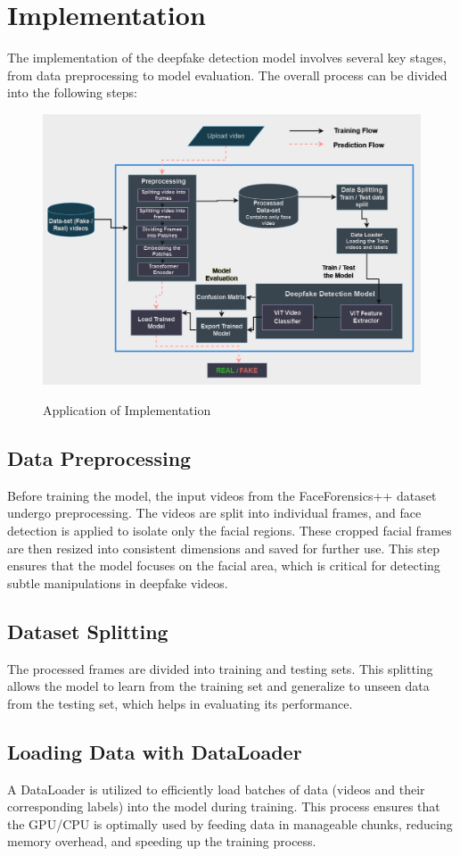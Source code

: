 \section{Implementation}
The implementation of the deepfake detection model involves several key stages, from data preprocessing to model evaluation. The overall process can be divided into the following steps:
\begin{figure}[h!]
  \centering
  \includegraphics[width=1\textwidth]{images/ViT-App-Architecture.png}
  \caption{Application of Implementation}\cite{df01}
  \label{fig:vit_app_architecture}
\end{figure}
\subsection{Data Preprocessing}
Before training the model, the input videos from the FaceForensics++ dataset undergo preprocessing. The videos are split into individual frames, and face detection is applied to isolate only the facial regions. These cropped facial frames are then resized into consistent dimensions and saved for further use. This step ensures that the model focuses on the facial area, which is critical for detecting subtle manipulations in deepfake videos.
\subsection{Dataset Splitting}
The processed frames are divided into training and testing sets. This splitting allows the model to learn from the training set and generalize to unseen data from the testing set, which helps in evaluating its performance.
\subsection{Loading Data with DataLoader}
A DataLoader is utilized to efficiently load batches of data (videos and their corresponding labels) into the model during training. This process ensures that the GPU/CPU is optimally used by feeding data in manageable chunks, reducing memory overhead, and speeding up the training process.
